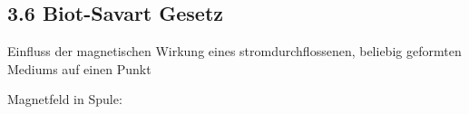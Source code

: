\subsection*{3.6 Biot-Savart Gesetz}
    Einfluss der magnetischen Wirkung eines stromdurchflossenen, beliebig geformten Mediums auf einen Punkt

    Magnetfeld in Spule:
